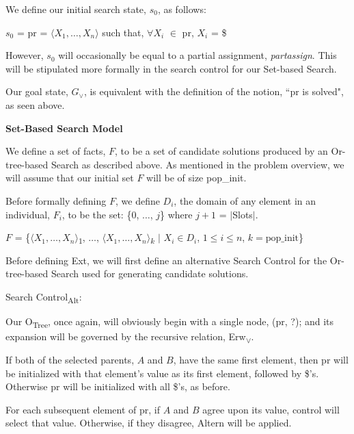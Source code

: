 \documentclass[11pt, oneside]{article}   	%
\newenvironment{cmr}{\fontfamily{cmr}\selectfont}{\par}
\begin{document}

\noindent We define our initial search state, $s_0$, as follows:

\noindent \centerline{$s_0$ = pr = $\langle X_1, \dots, X_n\rangle$ such that, $\forall X_i$ $\in$ pr, $X_i$ = \$}

\noindent However, $s_0$ will occasionally be equal to a partial assignment, \textit{partassign}. This will be stipulated more formally in the search control for our Set-based Search.

\noindent Our goal state, $G_{\lor}$, is equivalent with the definition of the notion, ``pr is solved", as seen above.\\
\newpage

\noindent \textbf{Set-Based Search Model}

\begin{cmr}
\noindent We define a set of facts, $F$, to be a set of candidate solutions produced by an Or-tree-based Search as described above.
As mentioned in the problem overview, we will assume that our initial set $F$ will be of size pop_init.
\end{cmr}

\noindent Before formally defining $F$, we define $D_i$, the domain of any element in an individual, $F_i$, to be the set: \{0, $\dots$, $j$\} where $j+1$ = $\vert$Slots$\vert$.

\noindent \centerline{$F$ = \{$\langle X_1, \dots, X_n\rangle$\textsubscript{$1$}, $\dots$, $\langle X_1, \dots, X_n\rangle$\textsubscript{$k$} $\vert$ $X_i \in D_i$, $1 \le i \le n$, $k = \text{pop_init}$\}}

\noindent Before defining Ext, we will first define an alternative Search Control for the Or-tree-based Search used for generating candidate solutions.

\noindent Search Control\textsubscript{Alt}:

\noindent Our O\textsubscript{Tree}, once again, will obviously begin with a single node, (pr, ?); and its expansion will be governed by the recursive relation, Erw\textsubscript{$\lor$}.

\noindent If both of the selected parents, $A$ and $B$, have the same first element, then pr will be initialized with that element's value as its first element, followed by \$'s. Otherwise pr will be initialized with all \$'s, as before.

\noindent For each subsequent element of pr, if $A$ and $B$ agree upon its value, control will select that value. Otherwise, if they disagree, Altern will be applied.
\end{document}
